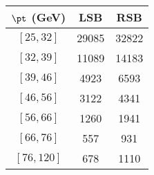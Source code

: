 \begin{tabular}{c||c|c}
$\pt$ (GeV) & LSB & RSB  \\
\hline
$[25, 32]$ & 29085 & 32822\\
$[32, 39]$ & 11089 & 14183\\
$[39, 46]$ & 4923 & 6593\\
$[46, 56]$ & 3122 & 4341\\
$[56, 66]$ & 1260 & 1941\\
$[66, 76]$ & 557 & 931\\
$[76, 120]$ & 678 & 1110\\
\end{tabular}
